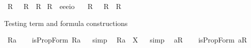 \begin{isabellebody}
\ R{}\ \ \ {\isachardoublequoteopen}R{}\ {\isasymequiv}\ {\isachardot}R{\isacharunderscore}{}{\isachardot}{\isachardoublequoteclose}\isanewline
{}\isamarkupfalse%
\ R{\isacharunderscore}{}\ {\isacharcolon}{\isacharcolon}\ {\isachardoublequoteopen}e{\isasymRightarrow}e{\isasymRightarrow}e{\isasymRightarrow}io{\isachardoublequoteclose}\ \ \isamarkupfalse%
\ R{}\ \ \ {\isachardoublequoteopen}R{}\ {\isasymequiv}\ {\isachardot}R{\isacharunderscore}{}{\isachardot}{\isachardoublequoteclose}%
\begin{isamarkuptext}%
Testing term and formula constructions%
\end{isamarkuptext}%
\isamarkuptrue%
\isamarkupfalse%
\ {\isachardoublequoteopen}{\isacharbrackleft}{\isacharless}R{}{\isasymbullet}a{\isachargreater}{\isacharbrackright}{\isachardoublequoteclose}\ \isamarkupfalse%
%
\isadelimproof
\ %
\endisadelimproof
%
\isatagproof
{}\isamarkupfalse%
%
\endisatagproof
{\isafoldproof}%
%
\isadelimproof
%
\endisadelimproof
\isanewline
{}\isamarkupfalse%
\ {\isachardoublequoteopen}isPropForm\ {\isacharless}R{}{\isasymbullet}a{\isachargreater}{\isachardoublequoteclose}%
\isadelimproof
\ %
\endisadelimproof
%
\isatagproof
{}\isamarkupfalse%
\ {\isacharparenleft}simp{\isacharparenright}\ \isamarkupfalse%
%
\endisatagproof
{\isafoldproof}%
%
\isadelimproof
%
\endisadelimproof
\isanewline
{}\isamarkupfalse%
\ {\isachardoublequoteopen}{\isacharless}R{}{\isasymbullet}a{\isachargreater}\ {\isacharequal}\ X{\isachardoublequoteclose}%
\isadelimproof
\ %
\endisadelimproof
%
\isatagproof
{}\isamarkupfalse%
\ {\isacharparenleft}simp{\isacharparenright}\ \isamarkupfalse%
%
\endisatagproof
{\isafoldproof}%
%
\isadelimproof
%
\endisadelimproof
\isanewline
\isanewline
{}\isamarkupfalse%
\ {\isachardoublequoteopen}{\isacharbrackleft}{\isacharless}a{\isasymcirc}R{}{\isachargreater}{\isacharbrackright}{\isachardoublequoteclose}\ \isamarkupfalse%
%
\isadelimproof
\ %
\endisadelimproof
%
\isatagproof
{}\isamarkupfalse%
%
\endisatagproof
{\isafoldproof}%
%
\isadelimproof
%
\endisadelimproof
\isanewline
{}\isamarkupfalse%
\ {\isachardoublequoteopen}isPropForm\ {\isacharless}a{\isasymcirc}R{}{\isachargreater}{\isachardoublequoteclose}%

\end{isabellebody}
